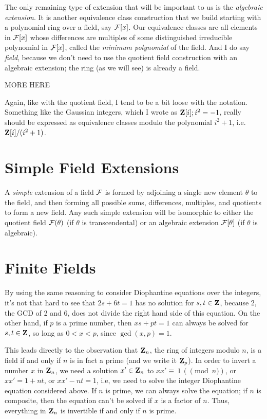 The only remaining type of extension that will be important to us is
the {\it algebraic extension}.  It is another equivalence class
construction that we build starting with a polynomial ring over a
field, say ${\cal F}[x]$.  Our equivalence classes are all elements in
${\cal F}[x]$ whose differences are multiples of some distinguished
irreducible polynomial in ${\cal F}[x]$, called the {\it minimum
polynomial} of the field.  And I do say {\it field}, because we don't
need to use the quotient field construction with an algebraic
extension; the ring (as we will see) is already a field.

MORE HERE

Again, like with the quotient field, I tend to be a bit loose with the
notation.  Something like the Gaussian integers, which I wrote as
${\bf Z}[i]; i^2=-1$, really should be expressed as equivalence
classes modulo the polynomial $i^2+1$, i.e.  ${\bf Z}[i]/(i^2+1)$.

\section{Simple Field Extensions}

A {\it simple} extension of a field ${\cal F}$ is formed by adjoining
a single new element $\theta$ to the field, and then forming all
possible sums, differences, multiples, and quotients to form a new
field.  Any such simple extension will be isomorphic to either the
quotient field ${\cal F}(\theta)$ (if $\theta$ is transcendental) or
an algebraic extension ${\cal F}[\theta]$ (if $\theta$ is algebraic).

\section{Finite Fields}

By using the same reasoning to consider Diophantine equations over the
integers, it's not that hard to see that $2s+6t=1$ has no solution for
$s,t\in{\bf Z}$, because 2, the GCD of 2 and 6, does not divide the
right hand side of this equation.  On the other hand, if $p$ is a
prime number, then $xs+pt=1$ can always be solved for $s,t\in{\bf Z}$,
so long as $0<x<p$, since $\gcd(x,p)=1$.

This leads directly to the observation that ${\bf Z}_n$, the ring of
integers modulo $n$, is a field if and only if $n$ is in fact a prime
(and we write it ${\bf Z}_p$).  In order to invert a number $x$ in
${\bf Z}_n$, we need a solution $x'\in{\bf Z}_n$ to $xx'\equiv\, 1\,
(\pmod n)$, or $xx' = 1 + nt$, or $xx' - nt = 1$, i.e, we need
to solve the integer Diophantine equation considered above.  If $n$ is
prime, we can always solve the equation; if $n$ is composite, then the
equation can't be solved if $x$ is a factor of $n$.  Thus, everything
in ${\bf Z}_n$ is invertible if and only if $n$ is prime.

